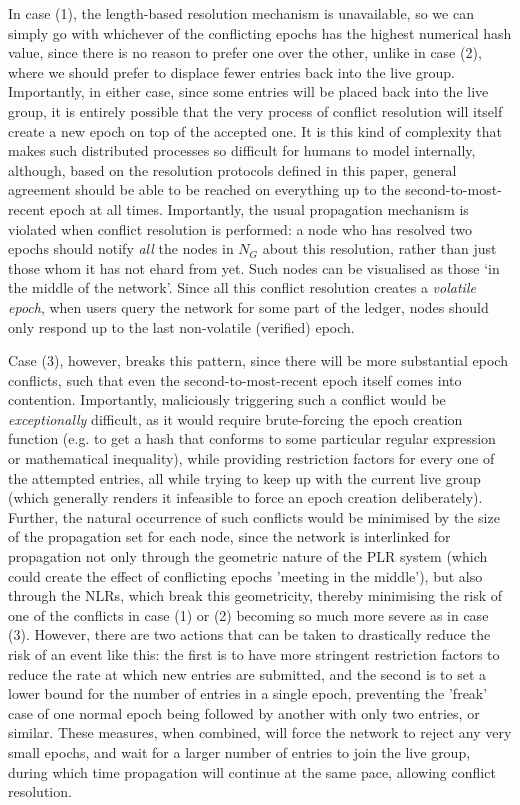 \documentclass{extreport}
\begin{document}
In case (1), the length-based resolution mechanism is unavailable, so we can simply go with whichever of the conflicting epochs has the highest numerical hash value, since there is no reason to prefer one over the other, unlike in case (2), where we should prefer to displace fewer entries back into the live group. Importantly, in either case, since some entries will be placed back into the live group, it is entirely possible that the very process of conflict resolution will itself create a new epoch on top of the accepted one. It is this kind of complexity that makes such distributed processes so difficult for humans to model internally, although, based on the resolution protocols defined in this paper, general agreement should be able to be reached on everything up to the second-to-most-recent epoch at all times. Importantly, the usual propagation mechanism is violated when conflict resolution is performed: a node who has resolved two epochs should notify \emph{all} the nodes in \(N_G\) about this resolution, rather than just those whom it has not ehard from yet. Such nodes can be visualised as those `in the middle of the network'. Since all this conflict resolution creates a \emph{volatile epoch}, when users query the network for some part of the ledger, nodes should only respond up to the last non-volatile (verified) epoch.

Case (3), however, breaks this pattern, since there will be more substantial epoch conflicts, such that even the second-to-most-recent epoch itself comes into contention. Importantly, maliciously triggering such a conflict would be \emph{exceptionally} difficult, as it would require brute-forcing the epoch creation function (e.g. to get a hash that conforms to some particular regular expression or mathematical inequality), while providing restriction factors for every one of the attempted entries, all while trying to keep up with the current live group (which generally renders it infeasible to force an epoch creation deliberately). Further, the natural occurrence of such conflicts would be minimised by the size of the propagation set for each node, since the network is interlinked for propagation not only through the geometric nature of the PLR system (which could create the effect of conflicting epochs 'meeting in the middle'), but also through the NLRs, which break this geometricity, thereby minimising the risk of one of the conflicts in case (1) or (2) becoming so much more severe as in case (3). However, there are two actions that can be taken to drastically reduce the risk of an event like this: the first is to have more stringent restriction factors to reduce the rate at which new entries are submitted, and the second is to set a lower bound for the number of entries in a single epoch, preventing the 'freak' case of one normal epoch being followed by another with only two entries, or similar. These measures, when combined, will force the network to reject any very small epochs, and wait for a larger number of entries to join the live group, during which time propagation will continue at the same pace, allowing conflict resolution.
\end{document}
